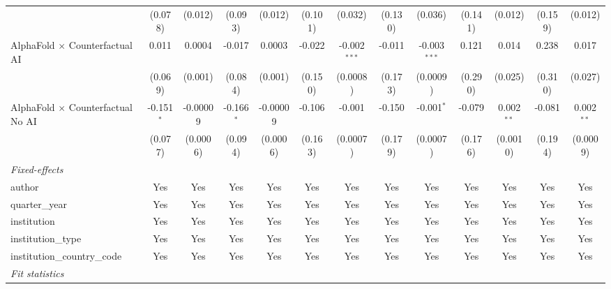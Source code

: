 \begin{tabular}{lcccccccccccc}
                                            & (0.078)      & (0.012)       & (0.093)      & (0.012)       & (0.101) & (0.032)        & (0.130) & (0.036)        & (0.141) & (0.012)       & (0.159) & (0.012)\\   
   AlphaFold $\times$ Counterfactual AI     & 0.011        & 0.0004        & -0.017       & 0.0003        & -0.022  & -0.002$^{***}$ & -0.011  & -0.003$^{***}$ & 0.121   & 0.014         & 0.238   & 0.017\\   
                                            & (0.069)      & (0.001)       & (0.084)      & (0.001)       & (0.150) & (0.0008)       & (0.173) & (0.0009)       & (0.290) & (0.025)       & (0.310) & (0.027)\\   
   AlphaFold $\times$ Counterfactual No AI  & -0.151$^{*}$ & -0.00009      & -0.166$^{*}$ & -0.00009      & -0.106  & -0.001         & -0.150  & -0.001$^{*}$   & -0.079  & 0.002$^{**}$  & -0.081  & 0.002$^{**}$\\   
                                            & (0.077)      & (0.0006)      & (0.094)      & (0.0006)      & (0.163) & (0.0007)       & (0.179) & (0.0007)       & (0.176) & (0.0010)      & (0.194) & (0.0009)\\   
   \midrule
   \emph{Fixed-effects}\\
   author                                   & Yes          & Yes           & Yes          & Yes           & Yes     & Yes            & Yes     & Yes            & Yes     & Yes           & Yes     & Yes\\  
   quarter\_year                            & Yes          & Yes           & Yes          & Yes           & Yes     & Yes            & Yes     & Yes            & Yes     & Yes           & Yes     & Yes\\  
   institution                              & Yes          & Yes           & Yes          & Yes           & Yes     & Yes            & Yes     & Yes            & Yes     & Yes           & Yes     & Yes\\  
   institution\_type                        & Yes          & Yes           & Yes          & Yes           & Yes     & Yes            & Yes     & Yes            & Yes     & Yes           & Yes     & Yes\\  
   institution\_country\_code               & Yes          & Yes           & Yes          & Yes           & Yes     & Yes            & Yes     & Yes            & Yes     & Yes           & Yes     & Yes\\  
   \midrule
   \emph{Fit statistics}\\

\end{tabular}
